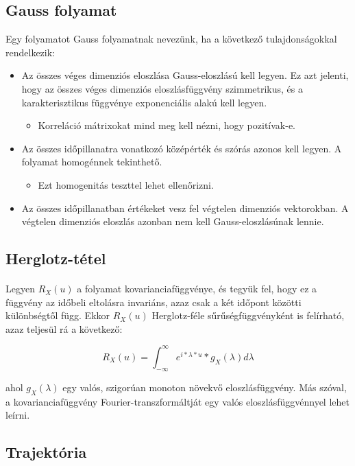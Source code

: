 \documentclass[11pt,a4paper]{article}
\begin{document}
			\subsection{Gauss folyamat}
			Egy folyamatot Gauss folyamatnak nevezünk, ha a következő tulajdonságokkal rendelkezik:
			\begin{itemize}
				\item Az összes véges dimenziós eloszlása Gauss-eloszlású kell legyen. Ez azt jelenti, hogy az összes véges dimenziós eloszlásfüggvény szimmetrikus, és a karakterisztikus függvénye exponenciális alakú kell legyen.
				\begin{itemize}
					\item Korreláció mátrixokat mind meg kell nézni, hogy pozitívak-e.
				\end{itemize}
					\item Az összes időpillanatra vonatkozó középérték és szórás azonos kell legyen. A folyamat homogénnek tekinthető.
				\begin{itemize}
					\item Ezt homogenitás teszttel lehet ellenőrizni.
				\end{itemize}
				\item Az összes időpillanatban értékeket vesz fel végtelen dimenziós vektorokban. A végtelen dimenziós eloszlás azonban nem kell Gauss-eloszlásúnak lennie.
			\end{itemize}
			\subsection{Herglotz-tétel}
				\paragraph{}
					Legyen $R_X (u)$ a folyamat kovarianciafüggvénye, és tegyük fel, hogy ez a függvény az időbeli eltolásra invariáns, azaz csak a két időpont közötti különbségtől függ. Ekkor $R_X (u)$ Herglotz-féle sűrűségfüggvényként is felírható, azaz teljesül rá a következő:

					$$R_X (u)=\int_{-\infty}^\infty e^{i*\lambda*u}*g_X(\lambda)d\lambda$$

					ahol $g_X(\lambda)$ egy valós, szigorúan monoton növekvő eloszlásfüggvény. Más szóval, a kovarianciafüggvény Fourier-transzformáltját egy valós eloszlásfüggvénnyel lehet leírni.
			\subsection{Trajektória}
\end{document}

